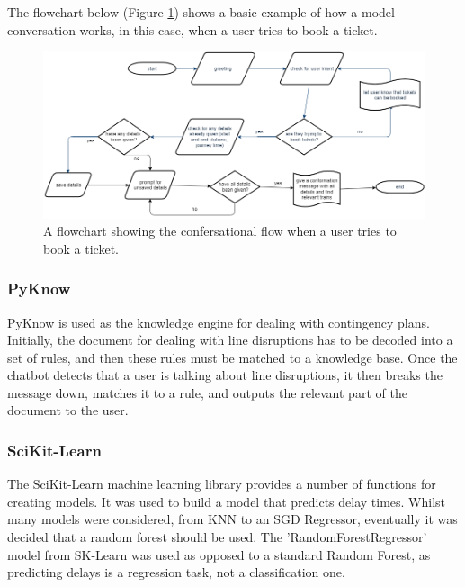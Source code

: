 \documentclass[12pt,a4paper]{article}
\begin{document}
    The flowchart below (Figure \ref{fig:overall_flowchart}) shows a basic example of how a model conversation works, in this case, when a user tries to book a ticket.
    
    \begin{figure}[H]
        \centering
        \includegraphics[scale=0.4]{Images/flowchart_overall.png}
        \caption{A flowchart showing the confersational flow when a user tries to book a ticket.}
        \label{fig:overall_flowchart}
    \end{figure}
    
    \subsubsection*{PyKnow}
    PyKnow is used as the knowledge engine for dealing with contingency plans. Initially, the document for dealing with line disruptions has to be decoded into a set of rules, and then these rules must be matched to a knowledge base. Once the chatbot detects that a user is talking about line disruptions, it then breaks the message down, matches it to a rule, and outputs the relevant part of the document to the user.
    
    \subsubsection*{SciKit-Learn}
    The SciKit-Learn machine learning library provides a number of functions for creating models. It was used to build a model that predicts delay times. Whilst many models were considered, from KNN to an SGD Regressor, eventually it was decided that a random forest should be used. The 'RandomForestRegressor' model from SK-Learn was used as opposed to a standard Random Forest, as predicting delays is a regression task, not a classification one. \\
    
\end{document}
